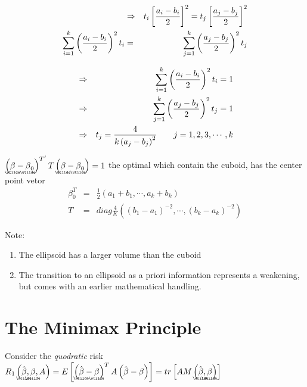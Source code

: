 \documentclass{article}
\begin{document}
\begin{eqnarray}
&\Rightarrow &t_{i}\left[ \frac{a_{i}-b_{i}}{2}\right] ^{2}=t_{j}\left[ 
\frac{a_{j}-b_{j}}{2}\right] ^{2} \\
\mathop{\displaystyle \sum }\limits_{i=1}^{k}\left( \frac{a_{i}-b_{i}}{2}\right) ^{2}t_{i}
&=&\mathop{\displaystyle \sum }\limits_{j=1}^{k}\left( \frac{a_{j}-b_{j}}{2}\right) ^{2}t_{j}
\end{eqnarray}

\begin{eqnarray}
&\Rightarrow &\mathop{\displaystyle \sum }\limits_{i=1}^{k}\left( \frac{a_{i}-b_{i}}{2}\right)
^{2}t_{i}=1 \\
&\Rightarrow &\mathop{\displaystyle \sum }\limits_{j=1}^{k}\left( \frac{a_{j}-b_{j}}{2}\right)
^{2}t_{j}=1 \\
&\Rightarrow &t_{j}=\frac{4}{k\left( a_{j}-b_{j}\right) ^{2}}\qquad
j=1,2,3,\cdots ,k
\end{eqnarray}

\bigskip

$\left( \underaccent{\wtilde}{\beta}-\underaccent{\wtilde}{\beta}_{0}\right)
^{T^{\prime }}T\left( \underaccent{\wtilde}{\beta}-\underaccent{\wtilde}{%
\beta}_{0}\right) =1$ the optimal which contain the cuboid, has the center
point vetor%
\begin{eqnarray}
\beta _{0}^{T} &=&\frac{1}{2}\left( a_{1}+b_{1},\cdots ,a_{k}+b_{k}\right) \\
T &=&diag\frac{4}{K}\left( \left( b_{1}-a_{1}\right) ^{-2},\cdots ,\left(
b_{k}-a_{k}\right) ^{-2}\right)
\end{eqnarray}

Note:

\begin{enumerate}
\item The ellipsoid has a larger volume than the cuboid

\item The transition to an ellipsoid as a priori information represents a
weakening, but comes with an earlier mathematical handling.
\end{enumerate}

\section{The Minimax Principle}

Consider the \emph{quodratic} risk $R_{1}\left( \underaccent{\wtilde}{\hat{%
\beta}},\underaccent{\wtilde}{\beta},A\right) =E\left[ \left( 
\underaccent{\wtilde}{\hat{\beta}}%
-%
\underaccent{\wtilde}{\beta}%
\right) ^{T}A\left( \hat{\beta}-\beta \right) \right] =tr\left[ AM\left( %
\underaccent{\wtilde}{\hat{\beta}},\underaccent{\wtilde}{\beta}\right) %
\right] $
\end{document}
